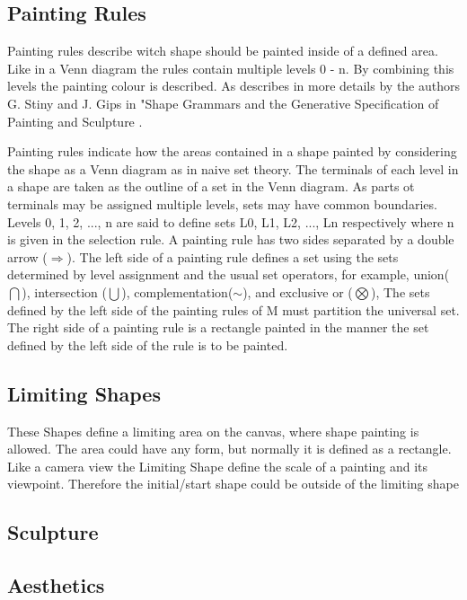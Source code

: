 \documentclass[11pt, a4paper]{report}
\begin{document}
\subsection{Painting Rules}
Painting rules describe witch shape should be painted inside of a defined area. Like in a Venn diagram the rules contain multiple levels 0 - n. By combining this levels the painting colour is described. As describes in more details by the authors G. Stiny and J. Gips in "Shape Grammars and the Generative Specification of Painting and Sculpture \citep{shapeGrammars:1972}.
\begin{displayquote}
    Painting rules indicate how the areas contained in a shape painted by considering the shape as a Venn diagram as in naive set theory. The terminals of each level in a shape are taken as the outline of a set in the Venn diagram. As parts ot terminals may be assigned multiple levels, sets may have common boundaries. Levels 0, 1, 2, ..., n are said to define sets L0, L1, L2, ..., Ln respectively where n is given in the selection rule.
    \newline
    A painting rule has two sides separated by a double arrow ($\Rightarrow$). The left side of a painting rule defines a set using the sets determined by level assignment and the usual set operators, for example, union($\bigcap$), intersection ($\bigcup$), complementation($\sim$), and exclusive or ($\bigotimes$), The sets defined by the left side of the painting rules of M must partition the universal set. The right side of a painting rule is a rectangle painted in the manner the set defined by the left side of the rule is to be painted.
\end{displayquote}

\subsection{Limiting Shapes}
These Shapes define a limiting area on the canvas, where shape painting is allowed. 
The area could have any form, but normally it is defined as a rectangle. Like a camera view the Limiting Shape define the scale of a painting and its viewpoint. Therefore the initial/start shape could be outside of the limiting shape 

\subsection{Sculpture}

\subsection{Aesthetics}
\end{document}
